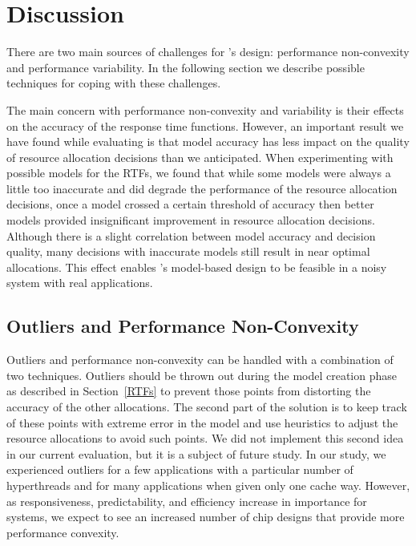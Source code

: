 \chapter{Discussion}\label{discuss}

There are two main sources of challenges for \pacora's design: performance non-convexity and performance variability.  In the following section we describe possible techniques for coping with these challenges.

The main concern with performance non-convexity and variability is their effects on the accuracy of the response time functions.  However, an important result we have found while evaluating \pacora is that model accuracy has less impact on the quality of resource allocation decisions than we anticipated.  When experimenting with possible models for the RTFs, we found that while some models were always a little too inaccurate and did degrade the performance of the resource allocation decisions, once a model crossed a certain threshold of accuracy then better models provided insignificant improvement in resource allocation decisions.  Although there is a slight correlation between model accuracy and decision quality, many decisions with inaccurate models still result in near optimal allocations.  This effect enables \pacora's model-based design to be feasible in a noisy system with real applications.

\section{Outliers and Performance Non-Convexity}

Outliers and performance non-convexity can be handled with a combination of two techniques.  Outliers should be thrown out during the model creation phase as described in Section~\ref{RTFs} to prevent those points from distorting the accuracy of the other allocations.  The second part of the solution is to keep track of these points with extreme error in the model and use heuristics to adjust the resource allocations to avoid such points.  We did not implement this second idea in our current evaluation, but it is a subject of future study.  In our study, we experienced outliers for a few applications with a particular number of hyperthreads and for many applications when given only one cache way. However, as responsiveness, predictability, and efficiency increase in importance for systems, we expect to see an increased number of chip designs that provide more performance convexity.


